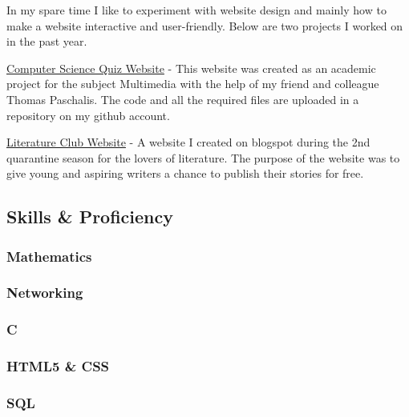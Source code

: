 \documentclass[english,]{article}
\begin{document}
In my spare time I like to experiment with website design and mainly how
to make a website interactive and user-friendly. Below are two projects
I worked on in the past year.

{ \href{https://quiz-pliroforikis.netlify.app/index.html}{Computer
Science Quiz Website} } - {This website was created as an academic
project for the subject Multimedia with the help of my friend and
colleague Thomas Paschalis. The code and all the required files are
uploaded in a repository on my github account.}

{
\href{https://lesxi-logotexnias.blogspot.com/p/home_12.html}{Literature
Club Website} } - {A website I created on blogspot during the 2nd
quarantine season for the lovers of literature. The purpose of the
website was to give young and aspiring writers a chance to publish their
stories for free.}

\hypertarget{skills-proficiency}{%
\subsection{\texorpdfstring{{ \emph{} \emph{} } Skills \&
Proficiency}{    Skills \& Proficiency}}\label{skills-proficiency}}

\hypertarget{mathematics}{%
\subsubsection{Mathematics}\label{mathematics}}

\hypertarget{networking}{%
\subsubsection{Networking}\label{networking}}

\hypertarget{c}{%
\subsubsection{C}\label{c}}

\hypertarget{html5-css}{%
\subsubsection{HTML5 \& CSS}\label{html5-css}}

\hypertarget{sql}{%
\subsubsection{SQL}\label{sql}}

{}
\end{document}
